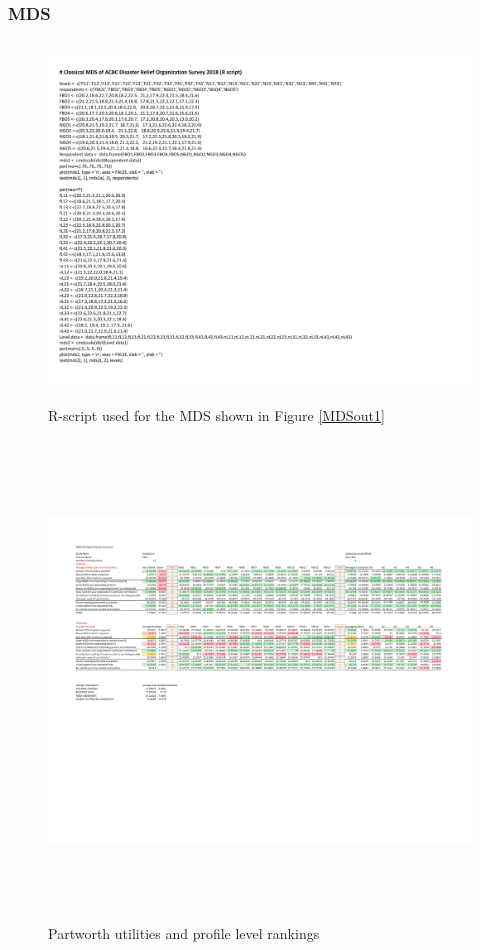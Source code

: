 \documentclass[a4paper, 12pt]{article}
\begin{document}
\subsubsection{MDS}
\begin{figure}[!htpb]
	\centering
	\includegraphics[width=5.5in, height=3.75in]{RScript.pdf}
	\caption{R-script used for the MDS shown in Figure \ref{MDSout1}}
	\label{AL}
\end{figure}


\begin{figure}[!htpb]
	\centering
	\includegraphics[width=6.75in, height=5in]{Combined.pdf}
	\caption{Partworth utilities and profile level rankings }
	\label{Combined}
\end{figure}
\end{document}
